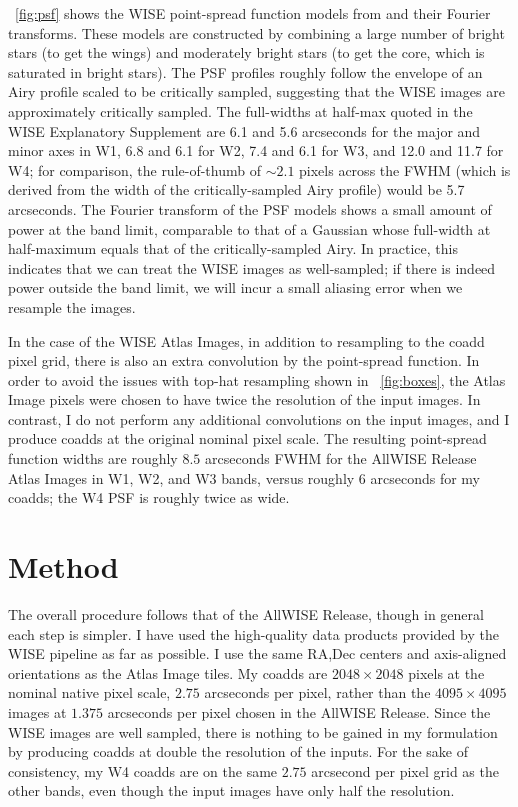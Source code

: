 \documentclass[11pt,preprint]{aastex}
\newcommand{\figref}[1]{\figurename~\ref{#1}}
\newcommand{\Figref}[1]{\figref{#1}}
\begin{document}
\Figref{fig:psf} shows the WISE point-spread function models from
\cite{meisner} and their Fourier transforms.  These models are
constructed by combining a large number of bright stars (to get the
wings) and moderately bright stars (to get the core, which is
saturated in bright stars).  The PSF profiles roughly follow the
envelope of an Airy profile scaled to be critically sampled,
suggesting that the WISE images are approximately critically sampled.
%
The full-widths at half-max quoted in the WISE Explanatory Supplement
are 6.1 and 5.6 arcseconds for the major and minor axes in W1, 6.8 and
6.1 for W2, 7.4 and 6.1 for W3, and 12.0 and 11.7 for W4; for
comparison, the rule-of-thumb of $\sim 2.1$ pixels across the FWHM
(which is derived from the width of the critically-sampled Airy
profile) would be 5.7 arcseconds.
%
The Fourier transform of the PSF models shows a small amount of power
at the band limit, comparable to that of a Gaussian whose full-width
at half-maximum equals that of the critically-sampled Airy.  In
practice, this indicates that we can treat the WISE images as
well-sampled; if there is indeed power outside the band limit, we will
incur a small aliasing error when we resample the images.


In the case of the WISE Atlas Images, in addition to resampling to the
coadd pixel grid, there is also an extra convolution by the
point-spread function.  In order to avoid the issues with top-hat
resampling shown in \figref{fig:boxes}, the Atlas Image pixels
were chosen to have twice the resolution of the input images.  In
contrast, I do not perform any additional convolutions on the input
images, and I produce coadds at the original nominal pixel scale.
The resulting point-spread function widths are roughly $8.5$
arcseconds FWHM for the AllWISE Release Atlas Images in W1, W2, and W3
bands, versus roughly $6$ arcseconds for my coadds; the W4 PSF is
roughly twice as wide.



\section{Method}


The overall procedure follows that of the AllWISE Release, though in
general each step is simpler.  I have used the high-quality data
products provided by the WISE pipeline as far as possible.  I use the
same RA,Dec centers and axis-aligned orientations as the Atlas Image
tiles.  My coadds are $2048 \times 2048$ pixels at the nominal native
pixel scale, $2.75$ arcseconds per pixel, rather than the $4095 \times
4095$ images at $1.375$ arcseconds per pixel chosen in the AllWISE
Release.  Since the WISE images are well sampled, there is nothing to
be gained in my formulation by producing coadds at double the
resolution of the inputs.  For the sake of consistency, my W4 coadds
are on the same $2.75$ arcsecond per pixel grid as the other bands,
even though the input images have only half the resolution.
\end{document}
